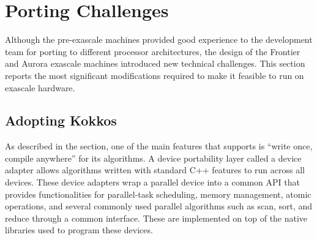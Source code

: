\section{Porting Challenges}

Although the pre-exascale machines provided good experience to the \vtkm development team for porting to different processor architectures, the design of the Frontier and Aurora exascale machines introduced new technical challenges.
This section reports the most significant modifications required to make it feasible to run \vtkm on exascale hardware.


\subsection{Adopting Kokkos}
\label{sec:adopting-kokkos}


As described in the  section,
one of the main features that \vtkm supports is ``write once, compile anywhere'' for its algorithms.
A device portability layer called a device adapter allows algorithms written with standard C++ features to run across all devices.
These device adapters wrap a parallel device into a common API that provides functionalities for parallel-task scheduling, memory management, atomic operations, and several commonly used parallel algorithms such as scan, sort, and reduce through a common interface.
These are implemented on top of the native libraries used to program these devices.

